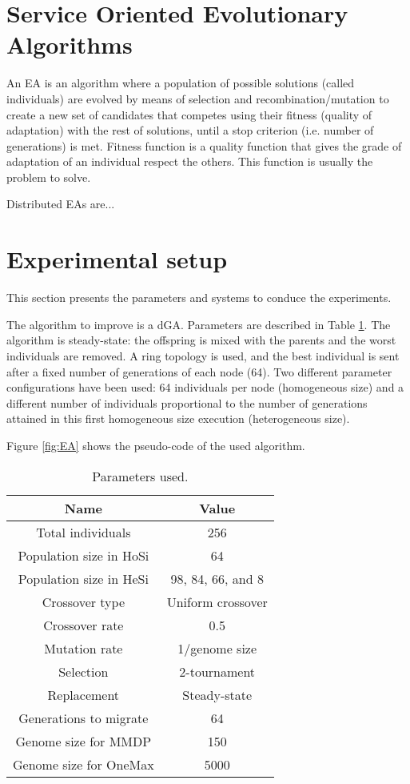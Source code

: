 \section{Service Oriented Evolutionary Algorithms}

An EA is an algorithm where a population of possible solutions (called individuals) are evolved by means of selection and recombination/mutation to create a new set of candidates that competes using their fitness (quality of adaptation) with the rest of solutions, until a stop criterion (i.e. number of generations) is met. Fitness function is a quality function that gives the grade of adaptation of an individual respect the others. This function is usually the problem to solve. %

Distributed EAs are... %



\section{Experimental setup}
\label{subsec:experiments}
This section presents the parameters and systems to conduce the experiments.

The algorithm to improve is a dGA. Parameters are described in Table \ref{table:parameters}. The algorithm is steady-state: the offspring is mixed with the parents and the worst individuals are removed. A ring topology is used, and the best individual is sent after a fixed number of generations of each node (64).  Two different parameter configurations have been used: 64 individuals per node (homogeneous size) and a different number of individuals proportional to the number of generations attained in this first homogeneous size execution (heterogeneous size).

Figure \ref{fig:EA} shows the pseudo-code of the used algorithm.

\begin{table}
\centering
\caption{Parameters used.}
\begin{tabular}{|c|c|} \hline
Name & Value\\ \hline
Total individuals & 256\\ \hline
Population size in HoSi & 64 \\ \hline
Population size in HeSi & 98, 84, 66, and 8\\ \hline
Crossover type & Uniform crossover \\ \hline
Crossover rate & 0.5\\ \hline
Mutation rate & 1/genome size\\ \hline
Selection & 2-tournament \\ \hline
Replacement & Steady-state\\ \hline
Generations to migrate & 64 \\ \hline
Genome size for MMDP & 150 \\ \hline
Genome size for OneMax & 5000 \\ 

\hline\end{tabular}
\label{table:parameters}
\end{table}

